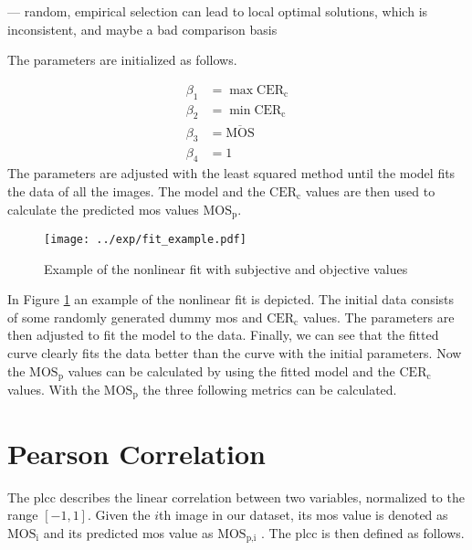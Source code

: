 --- random, empirical selection can lead to local optimal solutions, which is inconsistent, and maybe a bad comparison basis

The parameters are initialized as follows.
 
\begin{equation}
    \begin{aligned}
        \beta_{1} &= \max{\text{CER}_{\text{c}}} \\
        \beta_{2} &= \min{\text{CER}_{\text{c}}} \\
        \beta_{3} &= \overline{\text{MOS}} \\
        \beta_{4} &= 1
    \end{aligned}
    \label{eq:nonlinear_init}
\end{equation}
The parameters are adjusted with the least squared method until the model fits the data of all the images.
The model and the $\text{CER}_{\text{c}}$ values are then used to calculate the predicted \gls{mos} values $\text{MOS}_{\text{p}}$.

\begin{figure}[h]
    \centering
    \texttt{[image: ../exp/fit\_example.pdf]}
    \caption{Example of the nonlinear fit with subjective and objective values}
    \label{fig:nonlinear_fit}
\end{figure}

In Figure \ref{fig:nonlinear_fit} an example of the nonlinear fit is depicted.
The initial data consists of some randomly generated dummy \gls{mos} and $\text{CER}_{\text{c}}$ values.
The parameters are then adjusted to fit the model to the data.
Finally, we can see that the fitted curve clearly fits the data better than the curve with the initial parameters.
Now the $\text{MOS}_{\text{p}}$ values can be calculated by using the fitted model and the $\text{CER}_{\text{c}}$ values.
With the $\text{MOS}_{\text{p}}$ the three following metrics \cite{iqa_survey_2021} can be calculated.

\section{Pearson Correlation}
\label{sec:pearson}

The \gls{plcc} \cite{pears_spear_2016} describes the linear correlation between two variables, normalized to the range $[-1, 1]$.
Given the $i$th image in our dataset, its \gls{mos} value is denoted as $\text{MOS}_{\text{i}}$ and its predicted \gls{mos} value as $\text{MOS}_{\text{p,i}}$ .
The \gls{plcc} is then defined as follows.

